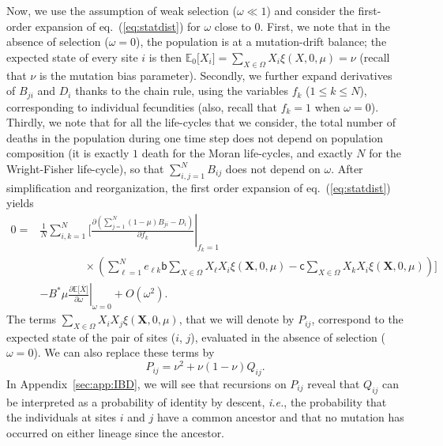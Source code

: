 \documentclass[11pt, letterpaper]{article}
\renewcommand{\eqref}[1]{\textup{{\normalfont eq.~(\ref{#1}}\normalfont)}}
\newcommand{\ie}{\textit{i.e.}}
\newcommand{\deriv}[2]{\partial_{#2}\!{#1}\,}
\newcommand{\derivv}[3]{\left.\frac{\partial #1}{\partial #2}\right |_{#3=0}} %
\newcommand{\derivvv}[3]{\left.\frac{\partial #1}{\partial #2}\right |_{#3}} %
\newcommand{\Esp}[1]{\mathbb{E}\big[ #1\big]}%
\newcommand{\Espzero}[1]{\mathbb{E}_0\big[ #1\big]}%
\newcommand{\bigO}[1]{O\left( #1 \right)}
\newcommand{\appname}[0]{Appendix}
\newcommand{\bb}{\mathsf{b}}
\newcommand{\cc}{\mathsf{c}}
\newcommand{\mutbias}{\nu}
\begin{document}
Now, we use the assumption of weak selection ($\omega \ll 1$) and consider the first-order expansion of \eqref{eq:statdist} for $\omega$ close to $0$. First, we note that in the absence of selection ($\omega = 0$), the population is at a mutation-drift balance; the expected state of every site $i$ is then $\Espzero{X_i} = \sum_{X\in \Omega} X_i \xi(X, 0, \mu)= \mutbias$ (recall that $\mutbias$ is the mutation bias parameter). Secondly, we further expand derivatives of $B_{ji}$ and $D_i$ thanks to the chain rule, using the variables $f_k$ ($1\leq k \leq N$), corresponding to individual fecundities (also, recall that $f_k=1$ when $\omega=0$). Thirdly, we note that for all the life-cycles that we consider, the total number of deaths in the population during one time step does not depend on population composition (it is exactly $1$ death for the Moran life-cycles, and exactly $N$ for the Wright-Fisher life-cycle), so that $\sum_{i,j=1}^N B_{ij}$ does not depend on $\omega$. 
After simplification and reorganization, the first order expansion of \eqref{eq:statdist} yields
%
%
\begin{equation}\label{eq:weaksel1}
\begin{split}
0 =&  \frac{1}{N}  \sum_{i,k=1}^N \Bigg[  \derivvv{\left(\sum_{j=1}^N (1-\mu) B_{ji}  - D_i \right)}{f_k}{f_k=1}  \\ 
%
&  \qquad \qquad \times \left( \sum_{\ell =1}^N e_{\ell k} \bb \sum_{X\in \Omega} X_{\ell} X_i \xi(\mathbf{X}, 0, \mu) - \cc \sum_{X\in \Omega} X_k X_i \xi(\mathbf{X}, 0, \mu) \right)  \Bigg] \\ 
%
%
%
& - B^* \mu \derivv{\Esp{\overline{X}}}{\omega}{\omega} 
%
+ \bigO{\omega^2}. 
\end{split}
\end{equation}
The terms $\sum_{X\in\Omega} X_i X_j \xi(\mathbf{X}, 0, \mu)$, that we will denote by $P_{ij}$, correspond to the expected state of the pair of sites ($i$, $j$), evaluated in the absence of selection ($\omega = 0$). We can also replace these terms by 
\begin{equation}\label{eq:QP}
P_{ij} = \mutbias^2 + \mutbias (1-\mutbias) Q_{ij}.
\end{equation}
%
In \appname~\ref{sec:app:IBD}, we will see that recursions on $P_{ij}$ reveal that $Q_{ij}$ can be interpreted as a probability of identity by descent, \ie, the probability that the individuals at sites $i$ and $j$ have a common ancestor and that no mutation has occurred on either lineage since the ancestor. 
\end{document}
